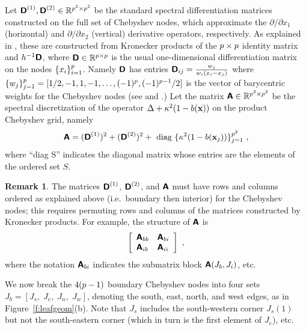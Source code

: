 \documentclass[11pt,final]{amsart}
\theoremstyle{definition}
\newtheorem{remark}{Remark}
\numberwithin{remark}{section}
\numberwithin{definition}{section}
\numberwithin{pro}{section}
\begin{document}
Let ${\bm{\mathsf{D}}^{(1)}},{\bm{\mathsf{D}}^{(2)}} \in \mathbb{R}^{p^2\times p^2}$ be the standard
spectral differentiation
matrices constructed on the full set of Chebyshev
nodes, which approximate the $\partial/\partial x_1$
(horizontal) and $\partial/\partial x_2$ (vertical) derivative operators, respectively.
As explained in \cite[Ch.~7]{tref},
these are constructed from Kronecker products of the $p\times p$ identity
matrix and $h^{-1} \bm{\mathsf{D}}$,
where $\bm{\mathsf{D}}\in\mathbb{R}^{p\times p}$
is the usual one-dimensional differentiation matrix
on the nodes $\{x_i\}_{i=1}^p$.
Namely $\bm{\mathsf{D}}$ has entries $\bm{\mathsf{D}}_{ij} = \frac{w_j}{w_i(x_i-x_j)}$
where $\{w_j\}_{j=1}^p = [1/2,-1,1,-1,\ldots,(-1)^p,(-1)^{p-1}/2]$ is
the vector of barycentric weights for the Chebyshev nodes (see \cite[Ch.~6]{tref} and \cite[Eqn.(8)]{salzer}.)
Let the matrix $\bm{\mathsf{A}}\in\mathbb{R}^{p^2\times p^2}$ be the spectral discretization
of the operator $\Delta + \kappa^2(1-b({\mathbf x}))$ on the product Chebyshev grid,
namely $$\bm{\mathsf{A}} = ({\bm{\mathsf{D}}^{(1)}})^2 + ({\bm{\mathsf{D}}^{(2)}})^2 + \mbox{ diag }\{\kappa^2(1-b({\mathbf x}_j))\}_{j=1}^{p^2}~,$$
where ``diag S'' indicates the diagonal matrix whose entries are the elements of the ordered set $S$.
\begin{remark}
The matrices ${\bm{\mathsf{D}}^{(1)}}$, ${\bm{\mathsf{D}}^{(2)}}$, and $\bm{\mathsf{A}}$ must have rows and columns
ordered as explained above (i.e.\ boundary then interior) for
the Chebyshev nodes;
this requires permuting rows and columns of the matrices constructed
by Kronecker products.
For example, the structure of $\bm{\mathsf{A}}$ is
$$\left[
\begin{array}{ll}
\bm{\mathsf{A}}_{bb} & \bm{\mathsf{A}}_{bi} \\
\bm{\mathsf{A}}_{ib} & \bm{\mathsf{A}}_{ii}
\end{array}
\right]
~,$$
where the notation $\bm{\mathsf{A}}_{bi}$ indicates the submatrix block $\bm{\mathsf{A}}(J_b,J_i)$, etc.
\end{remark}

We now break the $4(p-1)$
boundary Chebyshev nodes into four sets $J_b = [J_s, \;J_e,\; J_n,\; J_w]$,
denoting the south, east, north, and west edges,
as in Figure~\ref{f:leafgeom}(b).
Note that $J_s$ includes the south-western corner $J_s(1)$ but not the
south-eastern corner (which in turn is the first element of $J_e$), etc.
\end{document}

